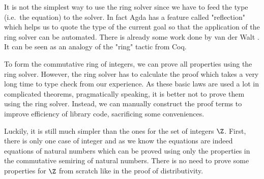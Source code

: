It is not the simplest way to use the ring solver since we have to feed
the type (i.e.\ the equation) to the solver. In fact Agda has a feature called "reflection" which helps us to quote the type of the current goal so that the application of the ring solver can be automated. There is already some work
done by van der Walt \cite{van2012reflection}. It can be seen as an
analogy of the "ring" tactic from Coq.

To form the commutative ring of integers, we can prove all properties using the ring solver. However, the ring solver has to calculate the proof which takes a very long time to type check from our experience. As
these basic laws are used a lot in complicated theorems, pragmatically speaking, it is better not to prove them using the ring solver.
Instead, we can manually construct the proof terms to improve efficiency of library
code, sacrificing some conveniences.

Luckily, it is still much simpler than the ones for the set of integers $\Z$.
First, there is only one case of integer and as we know the equations are
indeed equations of natural numbers which can be proved using only the
properties in the commutative semiring of natural numbers. There is no
need to prove some properties for $\Z$ from scratch like in the
proof of distributivity.

